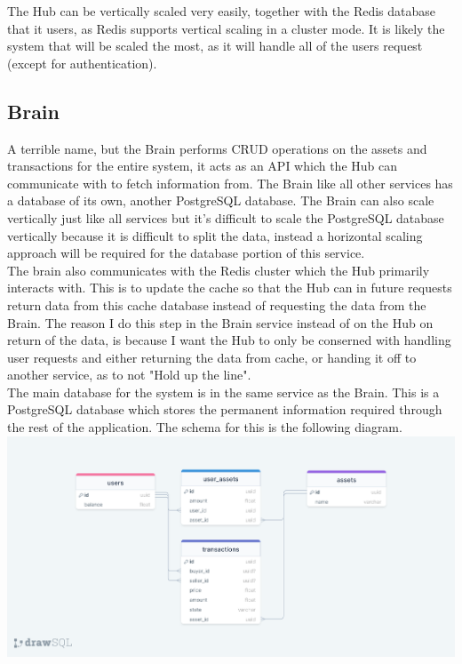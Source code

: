 \documentclass[titlepage]{article}
\begin{document}
The Hub can be vertically scaled very easily, together with the Redis database that it users, as Redis supports vertical scaling in a cluster mode. It is likely the system that will be scaled the most, as it will handle all of the users request (except for authentication).

\subsection{Brain}
A terrible name, but the Brain performs CRUD operations on the assets and transactions for the entire system, it acts as an API which the Hub can communicate with to fetch information from. The Brain like all other services has a database of its own, another PostgreSQL database. The Brain can also scale vertically just like all services but it's difficult to scale the PostgreSQL database vertically because it is difficult to split the data, instead a horizontal scaling approach will be required for the database portion of this service. \\

The brain also communicates with the Redis cluster which the Hub primarily interacts with. This is to update the cache so that the Hub can in future requests return data from this cache database instead of requesting the data from the Brain. The reason I do this step in the Brain service instead of on the Hub on return of the data, is because I want the Hub to only be conserned with handling user requests and either returning the data from cache, or handing it off to another service, as to not "Hold up the line". \\

The main database for the system is in the same service as the Brain. This is a PostgreSQL database which stores the permanent information required through the rest of the application. The schema for this is the following diagram. \\

\hspace*{-2cm}
\includegraphics[width=1.25\textwidth]{brain_diagram.png}
\end{document}

